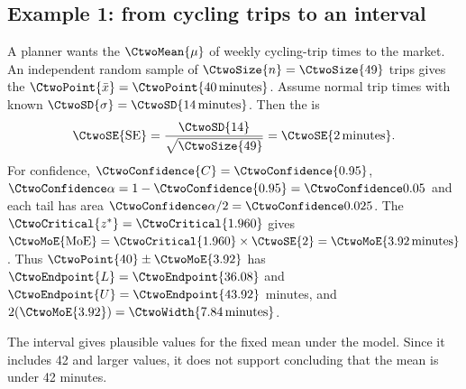 \noindent\begin{minipage}{\linewidth}
\subsection{Example 1: from cycling trips to an interval}
\label{subsec:c2-cycling-example}
A planner wants the  $\CtwoMean{\mu}$ of weekly cycling-trip times to the market. An independent random sample of $\CtwoSize{n}=\CtwoSize{49}$ trips gives the  $\CtwoPoint{\bar{x}}=\CtwoPoint{40\,\text{minutes}}$. Assume normal trip times with known  $\CtwoSD{\sigma}=\CtwoSD{14\,\text{minutes}}$. Then the  is
\[
\CtwoSE{\mathrm{SE}}=\frac{\CtwoSD{14}}{\sqrt{\CtwoSize{49}}}=\CtwoSE{2\,\text{minutes}}.
\]
For  confidence, $\CtwoConfidence{C}=\CtwoConfidence{0.95}$, $\CtwoSignificance{\alpha}=1-\CtwoConfidence{0.95}=\CtwoSignificance{0.05}$ and each tail has area $\CtwoSignificance{\alpha}/2=\CtwoSignificance{0.025}$. The  $\CtwoCritical{z^*}=\CtwoCritical{1.960}$ gives  $\CtwoMoE{\mathrm{MoE}}=\CtwoCritical{1.960}\times\CtwoSE{2}=\CtwoMoE{3.92\,\text{minutes}}$. Thus $\CtwoPoint{40}\pm\CtwoMoE{3.92}$ has  $\CtwoEndpoint{L}=\CtwoEndpoint{36.08}$ and $\CtwoEndpoint{U}=\CtwoEndpoint{43.92}$ minutes, and  $2(\CtwoMoE{3.92})=\CtwoWidth{7.84\,\text{minutes}}$.

The interval gives plausible values for the fixed mean under the model. Since it includes 42 and larger values, it does not support concluding that the mean is under 42 minutes.
\par\vspace{3mm}
\end{minipage}\par

